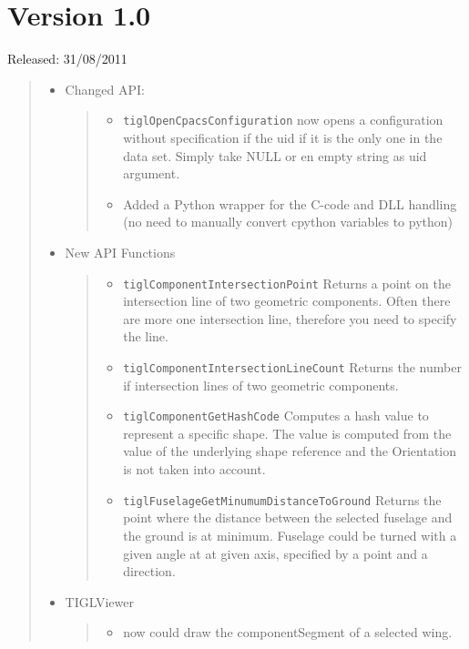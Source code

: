 \documentclass[]{scrartcl}
\begin{document}
\section{Version 1.0}\label{version-1.0}

Released: 31/08/2011

\begin{quote}
\begin{itemize}
\item
  Changed API:

  \begin{quote}
  \begin{itemize}
  \itemsep1pt\parskip0pt
  \item
    \texttt{tiglOpenCpacsConfiguration} now opens a configuration
    without specification if the uid if it is the only one in the data
    set. Simply take NULL or en empty string as uid argument.
  \item
    Added a Python wrapper for the C-code and DLL handling (no need to
    manually convert cpython variables to python)
  \end{itemize}
  \end{quote}
\item
  New API Functions

  \begin{quote}
  \begin{itemize}
  \itemsep1pt\parskip0pt
  \item
    \texttt{tiglComponentIntersectionPoint} Returns a point on the
    intersection line of two geometric components. Often there are more
    one intersection line, therefore you need to specify the line.
  \item
    \texttt{tiglComponentIntersectionLineCount} Returns the number if
    intersection lines of two geometric components.
  \item
    \texttt{tiglComponentGetHashCode} Computes a hash value to represent
    a specific shape. The value is computed from the value of the
    underlying shape reference and the Orientation is not taken into
    account.
  \item
    \texttt{tiglFuselageGetMinumumDistanceToGround} Returns the point
    where the distance between the selected fuselage and the ground is
    at minimum. Fuselage could be turned with a given angle at at given
    axis, specified by a point and a direction.
  \end{itemize}
  \end{quote}
\item
  TIGLViewer

  \begin{quote}
  \begin{itemize}
  \itemsep1pt\parskip0pt
  \item
    now could draw the componentSegment of a selected wing.
  \end{itemize}
  \end{quote}
\end{itemize}
\end{quote}
\end{document}
